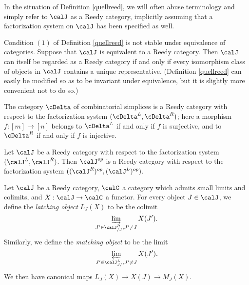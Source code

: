 \begin{remark}
In the situation of Definition \ref{quellreed}, we will often abuse terminology and simply refer to $\calJ$ as a Reedy category, implicitly assuming that a factorization system on $\calJ$ has been specified as well.
\end{remark}

\begin{warning}
Condition $(1)$ of Definition \ref{quellreed} is not stable under equivalence of categories.
Suppose that $\calJ$ is equivalent to a Reedy category. Then $\calJ$ can itself be regarded as a Reedy category if and only if every isomorphism class of objects in $\calJ$ contains
a unique representative. (Definition \ref{quellreed} can easily be modified so as to be invariant under equivalence, but it is slightly more convenient not to do so.)
\end{warning}

\begin{example}\label{onep}
The category $\cDelta$ of combinatorial simplices is a Reedy category with respect to
the factorization system $( \cDelta^{L}, \cDelta^{R} )$; here a morphism
$f: [m] \rightarrow [n]$ belongs to $\cDelta^{L}$ if and only if $f$ is surjective, and
to $\cDelta^{R}$ if and only if $f$ is injective.
\end{example}

\begin{example}\label{twop}
Let $\calJ$ be a Reedy category with respect to the factorization system
$( \calJ^{L}, \calJ^{R})$. Then $\calJ^{op}$ is a Reedy category with respect to the
factorization system $( (\calJ^R)^{op}, (\calJ^{L})^{op} )$. 
\end{example}

\begin{notation}\label{bugga}
Let $\calJ$ be a Reedy category, $\calC$ a category which admits small limits and colimits, and $X: \calJ \rightarrow \calC$ a functor. For every object $J \in \calJ$, we define the
{\it latching object} $L_{J}(X)$ to be the colimit
$$ \varinjlim_{J' \in \calJ^{R}_{/J}, J' \neq J} X(J').$$
Similarly, we define the {\it matching object}
 to be the limit
$$ \varprojlim_{J' \in \calJ^{L}_{J/}, J' \neq J} X(J').$$
We then have canonical maps
$L_{J}(X) \rightarrow X(J) \rightarrow M_{J}(X).$
\end{notation}

